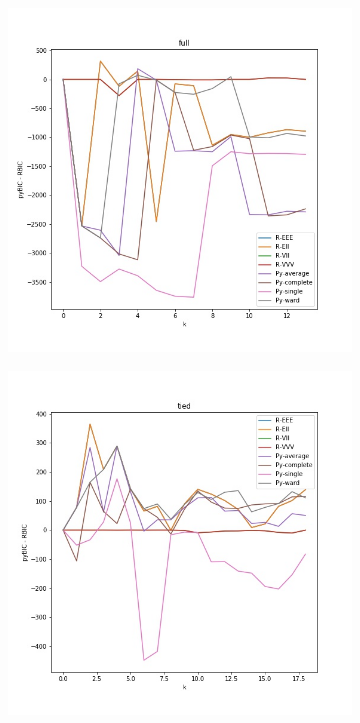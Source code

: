 \documentclass{article}
\begin{document}
\begin{figure}[h!]
\centering
\begin{subfigure}[b]{0.45\linewidth}
  \includegraphics[width=\linewidth]{full.jpg}
\end{subfigure}
\begin{subfigure}[b]{0.45\linewidth}
  \includegraphics[width=\linewidth]{tied.jpg}
\end{subfigure} 


\end{figure}
\end{document}
